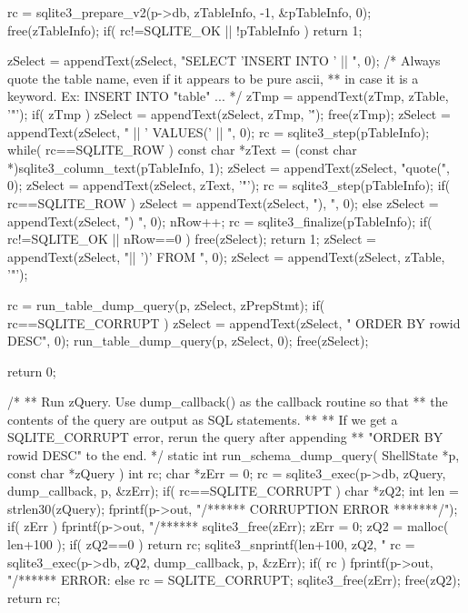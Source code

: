 \begin{Codex}[label=shell.c,numbers=left]
{{{    rc = sqlite3_prepare_v2(p->db, zTableInfo, -1, &pTableInfo, 0);
    free(zTableInfo);
    if( rc!=SQLITE_OK || !pTableInfo ){
      return 1;
    }

    zSelect = appendText(zSelect, "SELECT 'INSERT INTO ' || ", 0);
    /* Always quote the table name, even if it appears to be pure ascii,
    ** in case it is a keyword. Ex:  INSERT INTO "table" ... */
    zTmp = appendText(zTmp, zTable, '"');
    if( zTmp ){
      zSelect = appendText(zSelect, zTmp, '\'');
      free(zTmp);
    }
    zSelect = appendText(zSelect, " || ' VALUES(' || ", 0);
    rc = sqlite3_step(pTableInfo);
    while( rc==SQLITE_ROW ){
      const char *zText = (const char *)sqlite3_column_text(pTableInfo, 1);
      zSelect = appendText(zSelect, "quote(", 0);
      zSelect = appendText(zSelect, zText, '"');
      rc = sqlite3_step(pTableInfo);
      if( rc==SQLITE_ROW ){
        zSelect = appendText(zSelect, "), ", 0);
      }else{
        zSelect = appendText(zSelect, ") ", 0);
      }
      nRow++;
    }
    rc = sqlite3_finalize(pTableInfo);
    if( rc!=SQLITE_OK || nRow==0 ){
      free(zSelect);
      return 1;
    }
    zSelect = appendText(zSelect, "|| ')' FROM  ", 0);
    zSelect = appendText(zSelect, zTable, '"');

    rc = run_table_dump_query(p, zSelect, zPrepStmt);
    if( rc==SQLITE_CORRUPT ){
      zSelect = appendText(zSelect, " ORDER BY rowid DESC", 0);
      run_table_dump_query(p, zSelect, 0);
    }
    free(zSelect);
  }
  return 0;
}

/*
** Run zQuery.  Use dump_callback() as the callback routine so that
** the contents of the query are output as SQL statements.
**
** If we get a SQLITE_CORRUPT error, rerun the query after appending
** "ORDER BY rowid DESC" to the end.
*/
static int run_schema_dump_query(
  ShellState *p, 
  const char *zQuery
){
  int rc;
  char *zErr = 0;
  rc = sqlite3_exec(p->db, zQuery, dump_callback, p, &zErr);
  if( rc==SQLITE_CORRUPT ){
    char *zQ2;
    int len = strlen30(zQuery);
    fprintf(p->out, "/****** CORRUPTION ERROR *******/\n");
    if( zErr ){
      fprintf(p->out, "/****** %
      sqlite3_free(zErr);
      zErr = 0;
    }
    zQ2 = malloc( len+100 );
    if( zQ2==0 ) return rc;
    sqlite3_snprintf(len+100, zQ2, "%
    rc = sqlite3_exec(p->db, zQ2, dump_callback, p, &zErr);
    if( rc ){
      fprintf(p->out, "/****** ERROR: %
    }else{
      rc = SQLITE_CORRUPT;
    }
    sqlite3_free(zErr);
    free(zQ2);
  }
  return rc;
}

}
\end{Codex}
